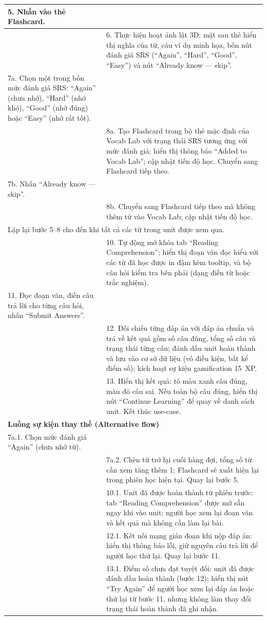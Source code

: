 \begin{longtable}{|p{\tbu}|p{\tbu}|}
    5. Nhấn vào thẻ Flashcard. & \\ \hline
    & 6. Thực hiện hoạt ảnh lật 3D; mặt sau thẻ hiển thị nghĩa của từ, câu ví dụ minh họa, bốn nút đánh giá SRS (``Again'', ``Hard'', ``Good'', ``Easy'') và nút ``Already know --- skip''. \\ \hline
    7a. Chọn một trong bốn mức đánh giá SRS: ``Again'' (chưa nhớ), ``Hard'' (nhớ khó), ``Good'' (nhớ đúng) hoặc ``Easy'' (nhớ rất tốt). & \\ \hline
    & 8a. Tạo Flashcard trong bộ thẻ mặc định của Vocab Lab với trạng thái SRS tương ứng với mức đánh giá; hiển thị thông báo ``Added to Vocab Lab''; cập nhật tiến độ học. Chuyển sang Flashcard tiếp theo. \\ \hline
    7b. Nhấn ``Already know --- skip''. & \\ \hline
    & 8b. Chuyển sang Flashcard tiếp theo mà không thêm từ vào Vocab Lab; cập nhật tiến độ học. \\ \hline
    \multicolumn{2}{|p{\dimexpr\linewidth - 2\tabcolsep - 2\arrayrulewidth\relax}|}{Lặp lại bước 5--8 cho đến khi tất cả các từ trong unit được xem qua.} \\ \hline
    & 10. Tự động mở khóa tab ``Reading Comprehension''; hiển thị đoạn văn đọc hiểu với các từ đã học được in đậm kèm tooltip, và bộ câu hỏi kiểm tra bên phải (dạng điền từ hoặc trắc nghiệm). \\ \hline
    11. Đọc đoạn văn, điền câu trả lời cho từng câu hỏi, nhấn ``Submit Answers''. & \\ \hline
    & 12. Đối chiếu từng đáp án với đáp án chuẩn và trả về kết quả gồm số câu đúng, tổng số câu và trạng thái từng câu; đánh dấu unit hoàn thành và lưu vào cơ sở dữ liệu (vô điều kiện, bất kể điểm số); kích hoạt sự kiện gamification 15~XP. \\ \hline
    & 13. Hiển thị kết quả: tô màu xanh câu đúng, màu đỏ câu sai. Nếu toàn bộ câu đúng, hiển thị nút ``Continue Learning'' để quay về danh sách unit. Kết thúc use-case. \\ \hline
    \multicolumn{2}{|l|}{\textbf{Luồng sự kiện thay thế (Alternative flow)}} \\ \hline
    7a.1. Chọn mức đánh giá ``Again'' (chưa nhớ từ). & \\ \hline
    & 7a.2. Chèn từ trở lại cuối hàng đợi, tổng số từ cần xem tăng thêm 1; Flashcard sẽ xuất hiện lại trong phiên học hiện tại. Quay lại bước 5. \\ \hline
    & 10.1. Unit đã được hoàn thành từ phiên trước: tab ``Reading Comprehension'' được mở sẵn ngay khi vào unit; người học xem lại đoạn văn và kết quả mà không cần làm lại bài. \\ \hline
    & 12.1. Kết nối mạng gián đoạn khi nộp đáp án: hiển thị thông báo lỗi, giữ nguyên câu trả lời để người học thử lại. Quay lại bước 11. \\ \hline
    & 13.1. Điểm số chưa đạt tuyệt đối: unit đã được đánh dấu hoàn thành (bước 12); hiển thị nút ``Try Again'' để người học xem lại đáp án hoặc thử lại từ bước 11, nhưng không làm thay đổi trạng thái hoàn thành đã ghi nhận. \\ \hline
\end{longtable}

